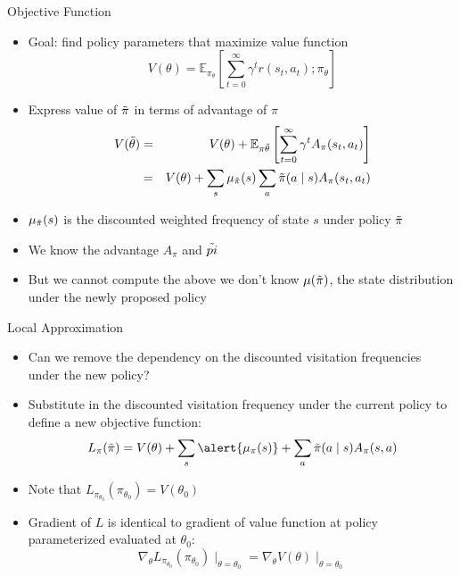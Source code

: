 \documentclass[aspectratio=169]{../latex_main/tntbeamer}  %
\begin{document}
\begin{frame}[c]{Objective Function}
	\vspace{-1em}
    \begin{itemize}
        \item Goal: find policy parameters that maximize value function
        $$ V(\theta) = \mathbb{E}_{\pi_\theta} \left[ \sum_{t=0}^{\infty} \gamma^t r(s_t, a_t); \pi_\theta \right]$$
        \item Express value of $\Tilde{\pi}$ in terms of advantage of $\pi$
        \begin{eqnarray}
        V(\Tilde{\theta}) &=& V(\theta) + \mathbb{E}_{\pi{\Tilde{\theta}}} \left[ \sum_{t=0}^{\infty} \gamma^t A_\pi(s_t, a_t) \right]\\
        &=& V(\theta) + \sum_{s} \mu_{\Tilde{\pi}}(s) \sum_{a} \Tilde{\pi}(a \mid s) A_\pi(s_t, a_t) 
        \end{eqnarray}
        \item $ \mu_{\Tilde{\pi}}(s)$ is the discounted weighted frequency of state $s$ under policy $\Tilde{\pi}$
        \item We know the advantage $A_\pi$ and $\Tilde{pi}$
        \item But we cannot compute the above we don't know $\mu(\Tilde{\pi})$, the state distribution under the newly proposed policy
    \end{itemize}

\end{frame}
\begin{frame}[c]{Local Approximation}
	
    \begin{itemize}
        \item Can we remove the dependency on the discounted visitation frequencies under the new policy?
        \item Substitute in the discounted visitation frequency under the current policy to define a new objective function:
        $$ L_\pi(\Tilde{\pi}) = V(\theta) + \sum_{s} \alert{\mu_\pi (s)} + \sum_{a} \Tilde{\pi}(a \mid s) A_\pi(s,a)$$
        \item Note that $L_{\pi_{\theta_0}}(\pi_{\theta_0}) = V(\theta_0)$
        \item Gradient of $L$ is identical to gradient of value function at policy parameterized evaluated at $\theta_0$: 
        $$\nabla_{\theta} L_{\pi_{\theta_0}}(\pi_{\theta_0})\mid_{\theta = \theta_0} = \nabla_\theta V(\theta)\mid_{\theta = \theta_0}$$
    \end{itemize}

\end{frame}
\end{document}
